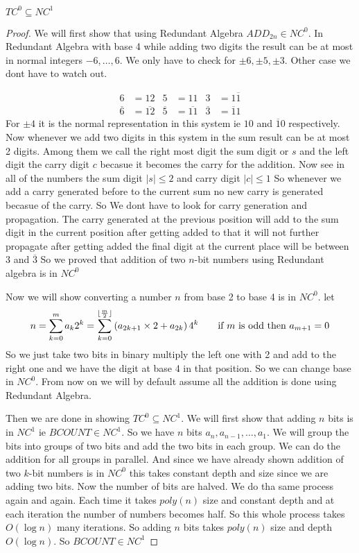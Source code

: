\begin{theorem}
	$TC^0\subseteq NC^1$
\end{theorem}
\begin{proof}
	We will first show that using Redundant Algebra $ADD_{2n}\in NC^0$. In Redundant Algebra with base 4 while adding two digits the result can be at most in normal integers $-6,\dots, 6$. We only have to check for $\pm 6,\pm 5,\pm 3$. Other case we dont have to watch out. 
	
	\begin{align*}
		6&=12 & 5&=11 & 3&=1\overline{1}\\
		\overline{6}&=\overline{12} & \overline{5}&=\overline{11} & \overline{3}&=\overline{1}1
	\end{align*}
	For $\pm 4$ it is the normal representation in this system ie $10$ and $\overline{1}0$ respectively. Now whenever we add two digits in this system in the sum result can be at most 2 digits. Among them we call the right most digit the sum digit or $s$ and the left digit the carry digit $c$ becasue it becomes the carry for the addition. Now see in all of the numbers the sum digit $|s|\leq 2$ and carry digit $|c|\leq 1$ So whenever we add a carry generated before to the current sum no new carry is generated becasue of the carry. So We dont have to look for carry generation and propagation. The carry generated at the previous position will add to the sum digit in the current position after getting added to that it will not further propagate after getting added the final digit at the current place will be between $3$ and $\overline{3}$ So we proved that addition of two $n$-bit numbers using Redundant algebra is in $NC^0$
	
	Now we will show converting a number $n$ from base 2 to base 4 is in $NC^0$. let $$n=\sum_{k=0}^{m}a_k2^k=\sum_{k=0}^{\lfloor \frac{m}2\rfloor}\left(a_{2k+1}\times 2+a_{2k}\right)4^k\qquad \text{if }m\text{ is odd then } a_{m+1}=0$$ So we just take two bits in binary multiply the left one with 2 and add to the right one and we have the digit at base 4 in that position. So we can change base in $NC^0$. From now on we will by default assume all the addition is done using Redundant Algebra.
	
	Then we are done in showing $TC^0\subseteq NC^1$. We will first show that adding $n$ bits is in $NC^1$ ie $BCOUNT\in NC^1$. So we have $n$ bits $a_n,a_{n-1},\dots, a_1$. We will group the bits into groups of two bits and add the two bits in each group. We can do the addition for all groups in parallel. And since we have already shown addition of two $k$-bit numbers is in $NC^0$ this takes constant depth and size since we are adding two bits. Now the number of bits are halved. We do tha same process again and again. Each time it takes $poly(n)$ size and constant depth and at each iteration the number of numbers becomes half. So this whole process takes $O(\log n)$ many iterations. So adding $n$ bits takes $poly(n)$ size and depth $O(\log n)$. So $BCOUNT\in NC^1$
	

\end{proof}
